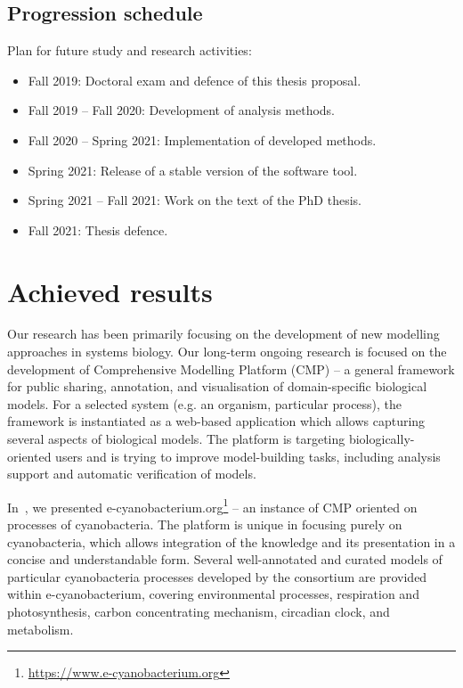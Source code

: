 \documentclass[11pt,a4paper]{report}
\begin{document}
\newpage
\section{Progression schedule}

Plan for future study and research activities:

\begin{itemize}
\item Fall 2019: Doctoral exam and defence of this thesis proposal.
\item Fall 2019 -- Fall 2020: Development of analysis methods.
\item Fall 2020 -- Spring 2021: Implementation of developed methods.
\item Spring 2021: Release of a stable version of the software tool.
\item Spring 2021 -- Fall 2021: Work on the text of the PhD thesis.
\item Fall 2021: Thesis defence.
\end{itemize}


\chapter{Achieved results}

Our research has been primarily focusing on the development of new modelling approaches in systems biology. Our long-term ongoing research is focused on the development of Comprehensive Modelling Platform (CMP) -- a general framework for public sharing, annotation, and visualisation of domain-specific biological models. For a selected system (e.g. an organism, particular process), the framework is instantiated as a web-based application which allows capturing several aspects of biological models. The platform is targeting biologically-oriented users and is trying to improve model-building tasks, including analysis support and automatic verification of models.

In~\cite{trojak2016cyanobacterium}, we presented e-cyanobacterium.org\footnote{\href{https://www.e-cyanobacterium.org}{https://www.e-cyanobacterium.org}} -- an instance of CMP oriented on processes of cyanobacteria. The platform is unique in focusing purely on cyanobacteria, which allows integration of the knowledge and its presentation in a concise and understandable form. Several well-annotated and curated models of particular cyanobacteria processes developed by the consortium are provided within e-cyanobacterium, covering environmental processes, respiration and photosynthesis, carbon concentrating mechanism, circadian clock, and metabolism.
\end{document}
